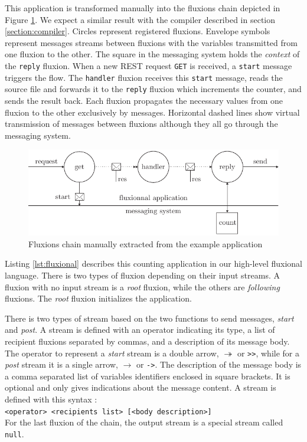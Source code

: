 This application is transformed manually into the fluxions chain depicted in Figure \ref{fig:fluxions}.
We expect a similar result with the compiler described in section \ref{section:compiler}.
Circles represent registered fluxions.
Envelope symbols represent messages streams between fluxions with the variables transmitted from one fluxion to the other.
The square in the messaging system holds the \textit{context} of the \texttt{reply} fluxion.
When a new REST request \texttt{GET} is received, a \texttt{start} message triggers the flow.
The \texttt{handler} fluxion receives this \texttt{start} message, reads the source file and forwards it to the \texttt{reply} fluxion which increments the counter, and sends the result back.
Each fluxion propagates the necessary values from one fluxion to the other exclusively by messages.
Horizontal dashed lines show virtual transmission of messages between fluxions although they all go through the messaging system.

\begin{figure}[h!]
  \includegraphics[width=\linewidth]{ressources/flux.pdf}
  \caption{Fluxions chain manually extracted from the example application}
  \label{fig:fluxions}
\end{figure}

Listing \ref{lst:fluxional} describes this counting application in our high-level fluxional language.
There is two types of fluxion depending on their input streams.
A fluxion with no input stream is a \textit{root} fluxion, while the others are \textit{following} fluxions.
The \textit{root} fluxion initializes the application.

There is two types of stream based on the two functions to send messages, \textit{start} and \textit{post}.
A stream is defined with an operator indicating its type, a list of recipient fluxions separated by commas, and a description of its message body. 
The operator to represent a \textit{start} stream is a double arrow, $\twoheadrightarrow$ or \texttt{>}\texttt{>}, while for a \textit{post} stream it is a single arrow, $\rightarrow$ or \texttt{->}.
The description of the message body is a comma separated list of variables identifiers enclosed in square brackets.
It is optional and only gives indications about the message content.
A stream is defined with this syntax :\\
\texttt{<operator> <recipients list> [<body description>]}\\
For the last fluxion of the chain, the output stream is a special stream called \texttt{null}.

